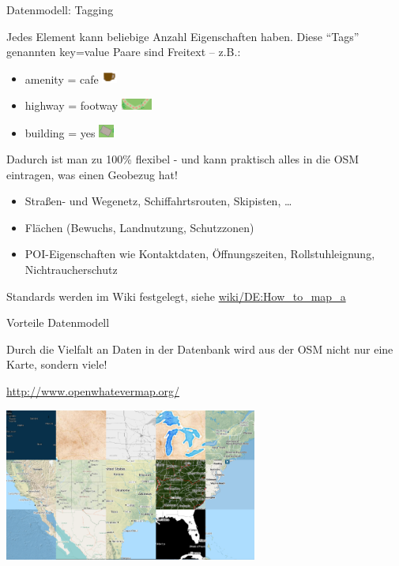 \documentclass[handout]{beamer}
\begin{document}
\begin{frame}{Datenmodell: Tagging}

Jedes Element kann beliebige Anzahl Eigenschaften haben. 
Diese "`Tags"' genannten key=value Paare sind Freitext -- z.B.:
\begin{itemize}
  \item amenity = cafe \includegraphics[width=0.5cm]{cafe.png}
  \item highway = footway \includegraphics[width=1cm]{footway.png}
  \item building = yes  \includegraphics[width=0.5cm]{building.png}
\end{itemize}

\pause
Dadurch ist man zu 100\% flexibel - und kann praktisch alles in die OSM eintragen, was einen Geobezug hat!

\begin{itemize}
  \item Straßen- und Wegenetz, Schiffahrtsrouten, Skipisten, \dots
  \item Flächen (Bewuchs, Landnutzung, Schutzzonen)
  \item POI-Eigenschaften wie Kontaktdaten, Öffnungszeiten, Rollstuhleignung, Nichtraucherschutz
\end{itemize}

Standards werden im Wiki festgelegt, siehe \href{http://wiki.openstreetmap.org/wiki/DE:How\_to\_map\_a}{wiki/DE:How\_to\_map\_a}

\end{frame}

\begin{frame}{Vorteile Datenmodell}

Durch die Vielfalt an Daten in der Datenbank wird aus der OSM nicht nur eine Karte, sondern viele!

\url{http://www.openwhatevermap.org/}
\begin{center}
\includegraphics[height=5cm]{style-whatever.png}
\end{center}

\end{frame}
\end{document}
